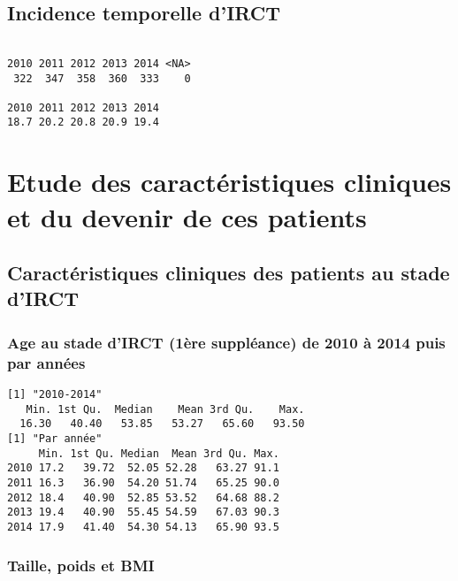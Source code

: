 \documentclass[11pt,a4paper]{article}\usepackage[]{graphicx}\usepackage[]{color}
\makeatletter
\newenvironment{kframe}{%
 \def\at@end@of@kframe{}%
 \ifinner\ifhmode%
  \def\at@end@of@kframe{\end{minipage}}%
  \begin{minipage}{\columnwidth}%
 \fi\fi%
 \def\FrameCommand##1{\hskip\@totalleftmargin \hskip-\fboxsep
 \colorbox{shadecolor}{##1}\hskip-\fboxsep
     \hskip-\linewidth \hskip-\@totalleftmargin \hskip\columnwidth}%
 \MakeFramed {\advance\hsize-\width
   \@totalleftmargin\z@ \linewidth\hsize
   \@setminipage}}%
 {\par\unskip\endMakeFramed%
 \at@end@of@kframe}
\newenvironment{knitrout}{}{} %
\makeatother
\begin{document}
  \subsection{Incidence temporelle d'IRCT}

\begin{knitrout}
\color{fgcolor}\begin{kframe}
\begin{verbatim}

2010 2011 2012 2013 2014 <NA> 
 322  347  358  360  333    0 

2010 2011 2012 2013 2014 
18.7 20.2 20.8 20.9 19.4 
\end{verbatim}
\end{kframe}
\end{knitrout}

\section{Etude des caractéristiques cliniques et du devenir de ces patients}

  \subsection{Caractéristiques cliniques des patients au stade d’IRCT}
  
    \subsubsection{Age au stade d’IRCT (1ère suppléance) de 2010 à 2014 puis par années}

\begin{knitrout}
\color{fgcolor}\begin{kframe}
\begin{verbatim}
[1] "2010-2014"
   Min. 1st Qu.  Median    Mean 3rd Qu.    Max. 
  16.30   40.40   53.85   53.27   65.60   93.50 
[1] "Par année"
     Min. 1st Qu. Median  Mean 3rd Qu. Max.
2010 17.2   39.72  52.05 52.28   63.27 91.1
2011 16.3   36.90  54.20 51.74   65.25 90.0
2012 18.4   40.90  52.85 53.52   64.68 88.2
2013 19.4   40.90  55.45 54.59   67.03 90.3
2014 17.9   41.40  54.30 54.13   65.90 93.5
\end{verbatim}
\end{kframe}
\end{knitrout}

    \subsubsection{Taille, poids et BMI}
  
\end{document}
